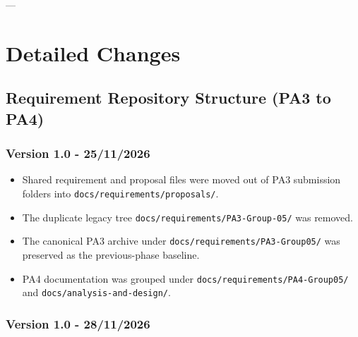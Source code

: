 \documentclass[12pt]{article}
\begin{document}
---
\par\medskip

\hypertarget{sec:detailed-changes}{}
\section*{Detailed Changes}
\par\medskip

\hypertarget{sec:requirement-repository-structure-pa3-to-pa4}{}
\subsection*{Requirement Repository Structure (PA3 to PA4)}
\par\medskip

\hypertarget{sec:version-1-0-25-11-2026}{}
\subsubsection*{Version 1.0 - 25/11/2026}
\par\medskip

\begin{itemize}
\item Shared requirement and proposal files were moved out of PA3 submission folders into \texttt{docs/requirements/proposals/}.
\item The duplicate legacy tree \texttt{docs/requirements/PA3-Group-05/} was removed.
\item The canonical PA3 archive under \texttt{docs/requirements/PA3-Group05/} was preserved as the previous-phase baseline.
\item PA4 documentation was grouped under \texttt{docs/requirements/PA4-Group05/} and \texttt{docs/analysis-and-design/}.
\end{itemize}
\par\medskip

\hypertarget{sec:version-1-0-28-11-2026}{}
\subsubsection*{Version 1.0 - 28/11/2026}
\par\medskip
\end{document}
